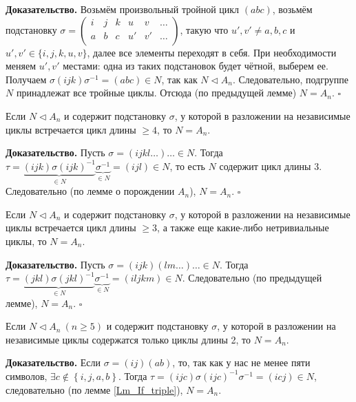 \textbf{Доказательство.}
%
Возьмём произвольный тройной цикл \(\left( {{abc}} \right)\),
возьмём подстановку
\(\sigma = \begin{pmatrix}
i & j & k & u & v & \ldots \\
a & b & c & u' & v' & \ldots \\
\end{pmatrix}\), такую что
\(u', v' \neq a, b, c\) и \(u', v'\in\{i,j,k,u,v\} \), далее все элементы
переходят в себя.
При необходимости меняем $u', v'$ местами: одна из таких подстановок будет чётной, выберем ее.
Получаем
\(\sigma\left( {{ijk}} \right)\sigma^{-1} = \left( {{abc}} \right) \in N\),
так как \(N \vartriangleleft A_{n}\). Следовательно, подгруппе \(N\)
принадлежат все тройные циклы. Отсюда (по предыдущей лемме)
\(N = A_{n}\). $\square$

\begin{lemma}
Если \(N\vartriangleleft A_n\) и содержит подстановку \(\sigma\), у которой в разложении на независимые циклы встречается цикл длины \(\geqslant4\), то \(N = A_{n}\).
\end{lemma}
\textbf{Доказательство.}
%
Пусть \(\sigma = \left( {{ijkl}}\ldots \right)\ldots\in N\).
Тогда
\(\tau = \underset{\in N}{\underbrace{(ijk)\sigma(ijk)^{-1}}}\underset{\in N}{\underbrace{\sigma^{-1}}} = (ijl) \in N\),
то есть \(N\) содержит цикл длины 3.
Следовательно (по лемме о порождении $A_n$), \(N = A_{n}\).
$\square$

\begin{lemma}
Если \(N\vartriangleleft A_n\) и содержит подстановку \(\sigma\), у которой в разложении на независимые циклы встречается цикл длины \(\geqslant3\), а также еще какие-либо нетривиальные циклы, то \(N = A_{n}\).
\end{lemma}
\textbf{Доказательство.}
Пусть \(\sigma = (ijk)(lm\ldots)\ldots\in N\).
Тогда
\(\tau = \underset{\in N}{\underbrace{(jkl)\sigma(jkl)^{-1}}} \underset{\in N}{\underbrace{\sigma^{-1}}} = \left(iljkm\right) \in N\).
Следовательно (по предыдущей лемме),
\(N = A_{n}\). $\square$

\begin{lemma}
Если \(N\vartriangleleft A_n\ (n\geqslant5)\) и содержит подстановку \(\sigma\), у которой в разложении на независимые циклы содержатся только циклы длины 2, то \(N = A_{n}\).
\end{lemma}

\textbf{Доказательство.}
%
Если
\(\sigma = \left( {{ij}} \right)\left( {{ab}} \right)\),
то, так как у нас не менее пяти символов,
\(\exists c \notin \left\{ i,j,a,b \right\}\). Тогда
\(\tau = \left( {{ijc}} \right)\sigma\left( {{ijc}} \right)^{-1}\sigma^{-1} = \left( {{icj}} \right) \in N\),
следовательно (по лемме \ref{Lm_If_triple}), \(N = A_{n}\).

